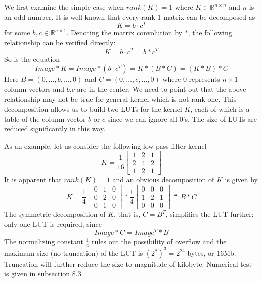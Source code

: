 \documentclass[12pt]{amsart}
\theoremstyle{definition}
\theoremstyle{remark}
\numberwithin{thm}{section}
\begin{document}
We first examine the simple case when $rank(K)=1$ where $K\in \mathbb{R}^{n\times n}$ and $n$ is an odd number. It is well known that every rank 1 matrix can be decomposed as
\[K=b\cdot c^T\]
for some $b,c\in \mathbb{R}^{n\times 1}$. Denoting the matrix convolution by $*$, the following relationship can be verified directly: 
\[K=b\cdot c^T=b*c^T\]
So is the equation
\[Image*K=Image*(b\cdot c^T)=K*(B*C)=(K*B)*C\]
Here $B=(0,\dots,b,\dots,0)$ and $C=(0,\dots,c,\dots,0)$ where $0$ represents $n\times 1$ column vectors and $b$,$c$ are in the center. We need to point out that the above relationship may not be true for general kernel which is not rank one. This decomposition allows us to build two LUTs for the kernel $K$, each of which is a table of the column vector $b$ or $c$ since we can ignore all $0$'s. The size of LUTs are reduced significantly in this way.

As an example, let us consider the following low pass filter kernel
$$
K=\frac{1}{16}
\begin{bmatrix}
1 & 2 & 1\\
2 & 4 & 2\\
1 & 2 & 1
\end{bmatrix}
$$
It is apparent that $rank(K)=1$ and an obvious decomposition of $K$ is given by 
$$
K=\frac{1}{4}
\begin{bmatrix}
0 & 1 & 0\\
0 & 2 & 0\\
0 & 1 & 0
\end{bmatrix}*\frac{1}{4}
\begin{bmatrix}
0 & 0 & 0\\
1 & 2 & 1\\
0 & 0 & 0
\end{bmatrix}\triangleq B*C
$$
The symmetric decomposition of $K$, that is, $C=B^T$, simplifies the LUT further: only one LUT is required, since
\[Image*C=Image^T*B\]
The normalizing constant $\frac{1}{4}$ rules out the possibility of overflow and the maximum size (no truncation) of the LUT is $(2^8)^3=2^{24}$ bytes, or 16Mb. Truncation will further reduce the size to magnitude of kilobyte. Numerical test is given in subsection 8.3. 
\end{document}

